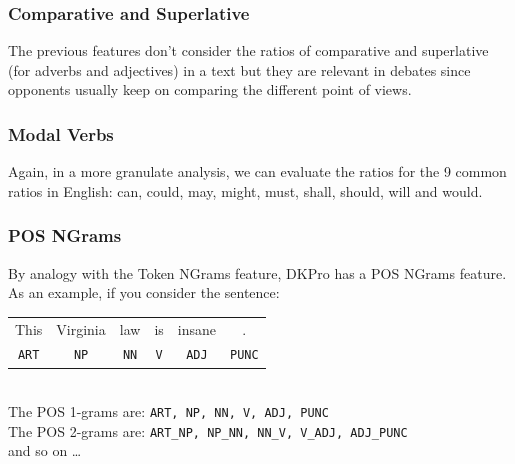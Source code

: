 \subsubsection{Comparative and Superlative}
The previous features don't consider the ratios of comparative and superlative (for adverbs and adjectives) in a text but they are relevant in debates since opponents usually keep on comparing the different point of views.

\subsubsection{Modal Verbs}
Again, in a more granulate analysis, we can evaluate the ratios for the 9 common ratios in English: can, could, may, might, must, shall, should, will and would.

\subsubsection{POS NGrams}
By analogy with the Token NGrams feature, DKPro has a POS NGrams feature. As an example, if you consider the sentence:

\begin{table}[h]
\center
\begin{tabular}{cccccc}
This & Virginia & law & is & insane & .    \\
\texttt{ART}  & \texttt{NP}       & \texttt{NN}  & \texttt{V}  & \texttt{ADJ}    & \texttt{PUNC}
\end{tabular}
\end{table}\
\\
The POS 1-grams are: \texttt{ART, NP, NN, V, ADJ, PUNC}
\\
The POS 2-grams are: \texttt{ART\_NP, NP\_NN, NN\_V, V\_ADJ, ADJ\_PUNC}
\\
and so on \ldots